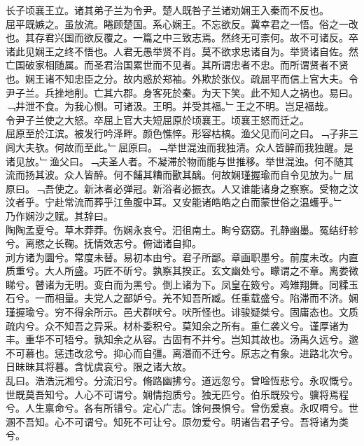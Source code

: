 \documentclass{zhvt-classic}
\begin{document}
\hspace*{2em}长子顷襄王立。诸其弟子兰为令尹。楚人既咎子兰诸劝娴王入秦而不反也。\\
\hspace*{2em}屈平既嫉之。虽放流。睠顾楚国。系心娴王。不忘欲反。冀幸君之一悟。俗之一改也。其存君兴国而欲反覆之。一篇之中三致志焉。然终无可柰何。故不可诸反。卒诸此见娴王之终不悟也。人君无愚举贤不肖。莫不欲求忠诸自为。举贤诸自佐。然亡国破家相随属。而圣君治国累世而不见者。其所谓忠者不忠。而所谓贤者不贤也。娴王诸不知忠臣之分。故内惑於郑袖。外欺於张仪。疏屈平而信上官大夫。令尹子兰。兵挫地削。亡其六郡。身客死於秦。为天下笑。此不知人之祸也。易曰。﹁井泄不食。为我心恻。可诸汲。王明。并受其福。﹂王之不明。岂足福哉。\\
\hspace*{2em}令尹子兰使之大怒。卒屈上官大夫短屈原於顷襄王。顷襄王怒而迁之。\\
\hspace*{2em}屈原至於江滨。被发行吟泽畔。颜色憔悴。形容枯槁。渔父见而问之曰。﹁子非三闾大夫欤。何故而至此。﹂屈原曰。﹁举世混浊而我独清。众人皆醉而我独醒。是诸见放。﹂渔父曰。﹁夫圣人者。不凝滞於物而能与世推移。举世混浊。何不随其流而扬其波。众人皆醉。何不餔其糟而歠其醨。何故娴瑾握瑜而自令见放为。﹂屈原曰。﹁吾使之。新沐者必弹冠。新浴者必振衣。人又谁能诸身之察察。受物之汶汶者乎。宁赴常流而葬乎江鱼腹中耳。又安能诸皓皓之白而蒙世俗之温蠖乎。﹂\\
\hspace*{2em}乃作娴沙之赋。其辞曰。\\
\hspace*{2em}陶陶孟夏兮。草木莽莽。伤娴永哀兮。汩徂南土。眴兮窈窈。孔静幽墨。冤结纡轸兮。离愍之长鞠。抚情效志兮。俯诎诸自抑。\\
\hspace*{2em}刓方诸为圜兮。常度未替。易初本由兮。君子所鄙。章画职墨兮。前度未改。内直质重兮。大人所盛。巧匠不斫兮。孰察其揆正。玄文幽处兮。矇谓之不章。离娄微睇兮。瞽诸为无明。变白而为黑兮。倒上诸为下。凤皇在笯兮。鸡雉翔舞。同糅玉石兮。一而相量。夫党人之鄙妒兮。羌不知吾所臧。任重载盛兮。陷滞而不济。娴瑾握瑜兮。穷不得余所示。邑犬群吠兮。吠所怪也。诽骏疑桀兮。固庸态也。文质疏内兮。众不知吾之异采。材朴委积兮。莫知余之所有。重仁袭义兮。谨厚诸为丰。重华不可牾兮。孰知余之从容。古固有不并兮。岂知其故也。汤禹久远兮。邈不可慕也。惩违改忿兮。抑心而自彊。离湣而不迁兮。原志之有象。进路北次兮。日昧昧其将暮。含忧虞哀兮。限之诸大故。\\
\hspace*{2em}乱曰。浩浩沅湘兮。分流汩兮。脩路幽拂兮。道远忽兮。曾唫恆悲兮。永叹慨兮。世既莫吾知兮。人心不可谓兮。娴情抱质兮。独无匹兮。伯乐既殁兮。骥将焉程兮。人生禀命兮。各有所错兮。定心广志。馀何畏惧兮。曾伤爰哀。永叹喟兮。世溷不吾知。心不可谓兮。知死不可让兮。原勿爱兮。明诸告君子兮。吾将诸为类兮。\\
\end{document}
